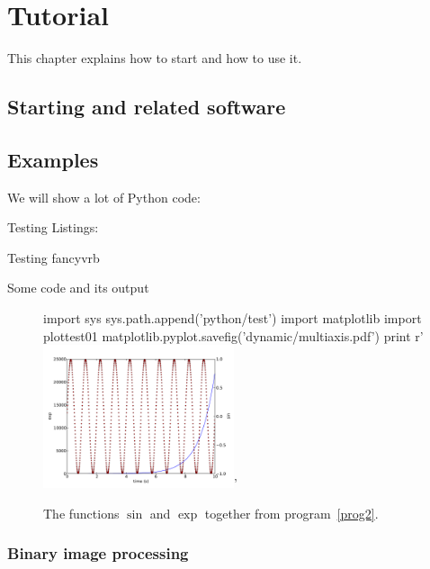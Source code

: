 \chapter{Tutorial}\label{chap:tutorial}
This chapter explains how to start \Pink and how to use it.

\section{Starting \Pink and related software}


\section{Examples}

We will show a lot of Python code:

Testing Listings:


Testing fancyvrb
\lstset{language=Python}



Some code and its output


\begin{figure}
\centering
\begin{python}
import sys
sys.path.append('python/test')
import matplotlib
import plottest01
matplotlib.pyplot.savefig('dynamic/multiaxis.pdf')
print r'\includegraphics[width=0.5\textwidth]{dynamic/multiaxis.pdf}'
\end{python}
\caption{The functions $\sin$ and $\exp$ together from program~\ref{prog2}.}
\end{figure}


\subsection{Binary image processing}

